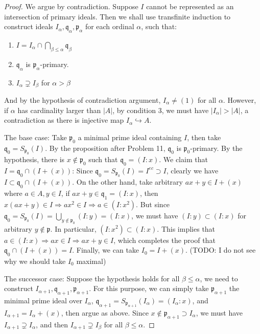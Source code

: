 \documentclass{solution}
\begin{document}
\begin{proof}
    We argue by contradiction. Suppose $I$ cannot be represented as an intersection of primary ideals. Then we shall use transfinite induction to construct ideals $I_\alpha, \mathfrak{q}_{\alpha}, \mathfrak{p}_{\alpha}$ for each ordinal $\alpha$, such that:
    \begin{enumerate}
        \item $I = I_{\alpha} \cap \bigcap\limits_{\beta \le \alpha} \mathfrak{q}_{\beta}$
        \item $\mathfrak{q}_{\alpha}$ is $\mathfrak{p}_{\alpha}$-primary.
        \item $I_{\alpha} \supsetneq I_{\beta}$ for $\alpha \gt \beta$
    \end{enumerate}
    And by the hypothesis of contradiction argument, $I_{\alpha} \ne (1)$ for all $\alpha$. However, if $\alpha$ has cardinality larger than $\left\lvert A \right\rvert$, by condition 3, we must have $\left\lvert I_{\alpha} \right\rvert \gt \left\lvert A \right\rvert$, a contradiction as there is injective map $I_{\alpha} \hookrightarrow A$.

    The base case: Take $\mathfrak{p}_0$ a minimal prime ideal containing $I$, then take $\mathfrak{q}_0 = S_{\mathfrak{p}_0}(I)$. By the proposition after Problem 11, $\mathfrak{q}_0$ is $\mathfrak{p}_0$-primary. By the hypothesis, there is $x \notin \mathfrak{p}_0$ such that $\mathfrak{q}_0 = (I : x)$. We claim that $I = \mathfrak{q}_0 \cap (I + (x))$: Since $\mathfrak{q}_0 = S_{\mathfrak{p}_0}(I) = I^{ec} \supset I$, clearly we have $I \subset \mathfrak{q}_0 \cap (I + (x))$. On the other hand, take arbitrary $ax + y \in I + (x)$ where $a \in A, y \in I$, if $ax + y \in \mathfrak{q}_1 = (I : x)$, then $x(ax + y) \in I \Rightarrow ax^2 \in I \Rightarrow a \in (I : x^2)$. But since $\mathfrak{q}_0 = S_{\mathfrak{p}_0}(I) = \bigcup\limits_{y \notin \mathfrak{p}_0} (I : y) = (I : x)$, we must have $(I : y) \subset (I : x)$ for arbitrary $y \notin \mathfrak{p}$. In particular, $(I : x^2) \subset (I : x)$. This implies that $a \in (I : x) \Rightarrow ax \in I \Rightarrow ax + y \in I$, which completes the proof that $\mathfrak{q}_0 \cap (I + (x)) = I$. Finally, we can take $I_0 = I + (x)$. ({\color{red}TODO: I do not see why we should take $I_0$ maximal})

    The successor case: Suppose the hypothesis holds for all $\beta \le \alpha$, we need to construct $I_{\alpha + 1}, \mathfrak{q}_{\alpha + 1}, \mathfrak{p}_{\alpha + 1}$. For this purpose, we can simply take $\mathfrak{p}_{\alpha + 1}$ the minimal prime ideal over $I_{\alpha}$, $\mathfrak{q}_{\alpha + 1} = S_{\mathfrak{p}_{\alpha + 1}}(I_{\alpha}) = (I_{\alpha} : x)$, and $I_{\alpha + 1} = I_{\alpha} + (x)$, then argue as above. Since $x \notin \mathfrak{p}_{\alpha + 1} \supset I_{\alpha}$, we must have $I_{\alpha + 1} \supsetneq I_{\alpha}$, and then $I_{\alpha + 1} \supsetneq I_{\beta}$ for all $\beta \le \alpha$.


\end{proof}
\end{document}
